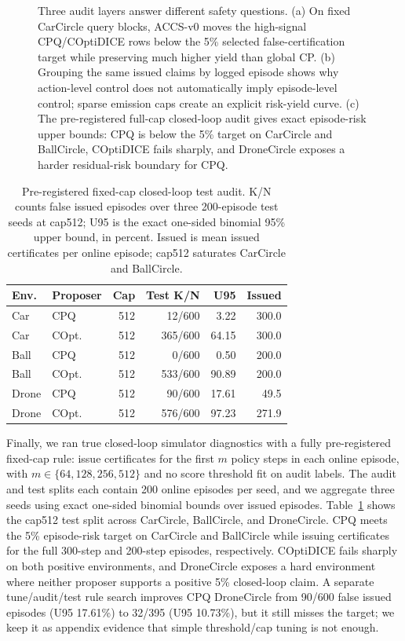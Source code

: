 \documentclass[letterpaper]{article}
\begin{document}
\begin{figure}[t]
\centering
\FigureAuditLayersTikZ
\caption{Three audit layers answer different safety questions. (a) On fixed
CarCircle query blocks, ACCS-v0 moves the high-signal CPQ/COptiDICE rows below
the 5\% selected false-certification target while preserving much higher yield
than global CP. (b) Grouping the same issued claims by logged episode shows why
action-level control does not automatically imply episode-level control; sparse
emission caps create an explicit risk-yield curve. (c) The pre-registered
full-cap closed-loop audit gives exact episode-risk upper bounds: CPQ is below
the 5\% target on CarCircle and BallCircle, COptiDICE fails sharply,
and DroneCircle exposes a harder residual-risk boundary for CPQ.}
\label{fig:audit-layers}
\end{figure}

\begin{table}[t]
\centering
\small
\setlength{\tabcolsep}{4pt}
\begin{tabular}{llrrrr}
\toprule
Env. & Proposer & Cap & Test K/N & U95 & Issued \\
\midrule
Car & CPQ & 512 & 12/600 & 3.22 & 300.0 \\
Car & COpt. & 512 & 365/600 & 64.15 & 300.0 \\
Ball & CPQ & 512 & 0/600 & 0.50 & 200.0 \\
Ball & COpt. & 512 & 533/600 & 90.89 & 200.0 \\
Drone & CPQ & 512 & 90/600 & 17.61 & 49.5 \\
Drone & COpt. & 512 & 576/600 & 97.23 & 271.9 \\
\bottomrule
\end{tabular}
\caption{Pre-registered fixed-cap closed-loop test audit. K/N counts false
issued episodes over three 200-episode test seeds at cap512; U95 is the exact
one-sided binomial 95\% upper bound, in percent. Issued is mean issued
certificates per online episode; cap512 saturates CarCircle and BallCircle.}
\label{tab:fixed-cap-closed-loop}
\end{table}

Finally, we ran true closed-loop simulator diagnostics with a fully
pre-registered fixed-cap rule: issue certificates for the first $m$ policy
steps in each online episode, with $m\in\{64,128,256,512\}$ and no score threshold fit
on audit labels. The audit and test splits each contain 200 online episodes per
seed, and we aggregate three seeds using exact one-sided binomial bounds over
issued episodes. Table~\ref{tab:fixed-cap-closed-loop} shows the cap512 test
split across CarCircle, BallCircle, and DroneCircle. CPQ meets the 5\%
episode-risk target on CarCircle and BallCircle while issuing certificates for
the full 300-step and 200-step episodes, respectively. COptiDICE fails sharply on both positive
environments, and DroneCircle exposes a hard environment where neither proposer
supports a positive 5\% closed-loop claim. A separate tune/audit/test rule
search improves CPQ DroneCircle from 90/600 false issued episodes (U95
17.61\%) to 32/395 (U95 10.73\%), but it still misses the target; we keep it
as appendix evidence that simple threshold/cap tuning is not enough.
\end{document}
